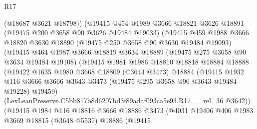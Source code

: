 \begin{lexlean}{R17}
\begin{coremodule}
                        (@18687 @3621 @18798))
                      (@19415
                        @454
                        @1989
                        @3666
                        @18821
                        @3626
                        @18891
                        (@19475 @200 @3658 @90 @3626 @19484 @19033)
                        (@19415
                          @459
                          @1988
                          @3666
                          @18820
                          @3630
                          @18890
                          (@19475 @250 @3658 @90 @3630 @19484 @19093)
                          (@19415
                            @464
                            @1987
                            @3666
                            @18819
                            @3634
                            @18889
                            (@19475 @275 @3658 @90 @3634 @19484 @19108)
                            (@19415
                              @1981
                              @1986
                              @18810
                              @18818
                              @18884
                              @18888
                              (@19422
                                @1635
                                @1980
                                @3668
                                @18809
                                (@3644 @3473)
                                @18884
                                (@19415
                                  @1932
                                  @116
                                  @3666
                                  @3666
                                  @3643
                                  @3473
                                  (@19475 @295 @3658 @90 @3643 @19484 @19228)
                                  @19459)
                                (LexLeanPreserve.C5bb817b8d6207bd3f89adaf093ca5e93.R17.__rel_36
                                  @3642))
                              (@19415
                                @1984
                                @116
                                @18816
                                @3666
                                @18886
                                @3473
                                (@4031
                                  @19406
                                  @406
                                  @1983
                                  @3669
                                  @18815
                                  (@3648 @5537)
                                  @18886
                                  (@19415

\end{coremodule}
\end{lexlean}
